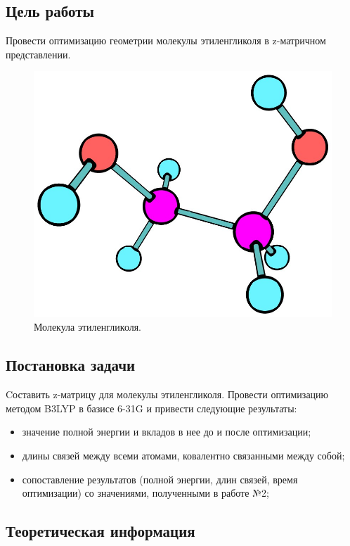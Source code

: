 \subsection{Цель работы}
Провести оптимизацию геометрии молекулы этиленгликоля в z-матричном представлении.

\begin{figure}[H]
\centering
\captionsetup{justification=centering}
\includegraphics[scale=0.4]{fig/0.jpg}
\caption{Молекула этиленгликоля.}
\end{figure}


\subsection{Постановка задачи}
Cоставить z-матрицу для молекулы этиленгликоля. Провести оптимизацию методом B3LYP в базисе 6-31G и привести следующие результаты: 
\begin{itemize}
    \item значение полной энергии и вкладов в нее до и после оптимизации;
    \item длины связей между всеми атомами, ковалентно связанными между собой;
    \item сопоставление результатов (полной энергии, длин связей, время оптимизации) со значениями, полученными в работе №2;
\end{itemize}


\subsection{Теоретическая информация}
